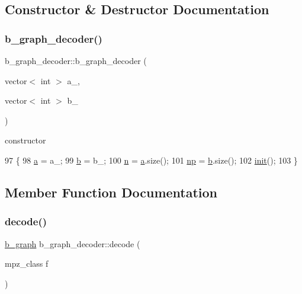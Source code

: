 \subsection{Constructor \& Destructor Documentation}
\mbox{\label{classb__graph__decoder_a2284e65bb4fcdd9356fc6a3109c2a4a7}} 
\subsubsection{\texorpdfstring{b\+\_\+graph\+\_\+decoder()}{b\_graph\_decoder()}}
{\footnotesize\ttfamily b\+\_\+graph\+\_\+decoder\+::b\+\_\+graph\+\_\+decoder (\begin{DoxyParamCaption}\item[{vector$<$ int $>$}]{a\+\_\+,  }\item[{vector$<$ int $>$}]{b\+\_\+ }\end{DoxyParamCaption})}



constructor 


\begin{DoxyCode}
97 \{
98   \hyperlink{classb__graph__decoder_afcf783e4199fb8f9d6828db08bb12333}{a} = a\_;
99   \hyperlink{classb__graph__decoder_a12d1a4a91f342111d2116196cb826317}{b} = b\_;
100   \hyperlink{classb__graph__decoder_a2caddd63df6808c95e2ee738f7c77870}{n} = \hyperlink{classb__graph__decoder_afcf783e4199fb8f9d6828db08bb12333}{a}.size();
101   \hyperlink{classb__graph__decoder_a7eca48cf8793e722d1b29dbdc9fd2dca}{np} = \hyperlink{classb__graph__decoder_a12d1a4a91f342111d2116196cb826317}{b}.size();
102   \hyperlink{classb__graph__decoder_a9498e8aa7391480cc663bffef3718c6b}{init}();
103 \}
\end{DoxyCode}


\subsection{Member Function Documentation}
\mbox{\label{classb__graph__decoder_a81cffad95fa5a051fa4421b164f236a9}} 
\subsubsection{\texorpdfstring{decode()}{decode()}}
{\footnotesize\ttfamily \hyperlink{classb__graph}{b\+\_\+graph} b\+\_\+graph\+\_\+decoder\+::decode (\begin{DoxyParamCaption}\item[{mpz\+\_\+class}]{f }\end{DoxyParamCaption})}



